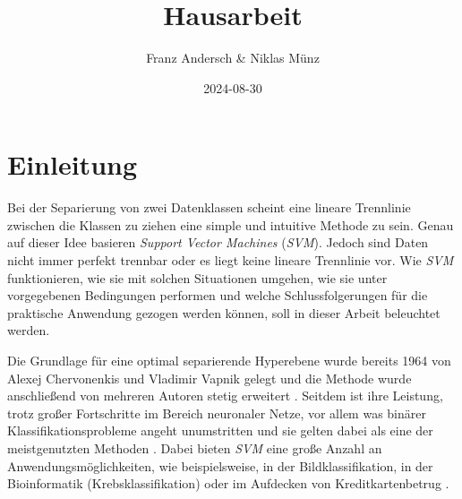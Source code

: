 \documentclass[
]{article}
\title{Hausarbeit}
\author{Franz Andersch \& Niklas Münz}
\date{2024-08-30}
\renewcommand{\maketitle}{}
\begin{document}
\maketitle


\newpage
\tableofcontents
\thispagestyle{empty}
\clearpage
{}
\section{Einleitung}

Bei der Separierung von zwei Datenklassen scheint eine lineare
Trennlinie zwischen die Klassen zu ziehen eine simple und intuitive
Methode zu sein. Genau auf dieser Idee basieren
\textit{Support Vector Machines} (\textit{SVM}). Jedoch sind Daten nicht
immer perfekt trennbar oder es liegt keine lineare Trennlinie vor. Wie
\textit{SVM} funktionieren, wie sie mit solchen Situationen umgehen, wie
sie unter vorgegebenen Bedingungen performen und welche
Schlussfolgerungen für die praktische Anwendung gezogen werden können,
soll in dieser Arbeit beleuchtet werden.

Die Grundlage für eine optimal separierende Hyperebene wurde bereits
1964 von Alexej Chervonenkis und Vladimir Vapnik gelegt und die Methode
wurde anschließend von mehreren Autoren stetig erweitert
\parencite{vapnikEstimationDependencesBased2006}. Seitdem ist ihre
Leistung, trotz großer Fortschritte im Bereich neuronaler Netze, vor
allem was binärer Klassifikationsprobleme angeht unumstritten und sie
gelten dabei als eine der meistgenutzten Methoden
\parencite{soofiClassificationTechniquesMachine2017}. Dabei bieten
\textit{SVM} eine große Anzahl an Anwendungsmöglichkeiten, wie
beispielsweise, in der Bildklassifikation, in der Bioinformatik
(Krebsklassifikation) oder im Aufdecken von Kreditkartenbetrug
\parencite{cervantesComprehensiveSurveySupport2020}.
\end{document}
